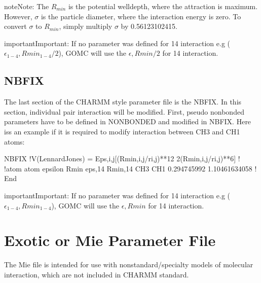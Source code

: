 \documentclass[letterpaper,10pt,english]{sphinxmanual}
\begin{document}
\begin{sphinxadmonition}{note}{Note:}
The \(R_{min}\) is the potential well\sphinxhyphen{}depth, where the attraction is maximum. However, \(\sigma\) is the particle diameter, where the interaction energy is zero. To convert \(\sigma\) to \(R_{min}\), simply multiply \(\sigma\) by 0.56123102415.
\end{sphinxadmonition}

\begin{sphinxadmonition}{important}{Important:}
If no parameter was defined for 1\sphinxhyphen{}4 interaction e.g (\(\epsilon_{1-4}, Rmin_{1-4}/2\)), GOMC will use the  \(\epsilon, Rmin/2\) for 1\sphinxhyphen{}4 interaction.
\end{sphinxadmonition}


\subsection{NBFIX}
\label{\detokenize{input_file:nbfix}}
The last section of the CHARMM style parameter file is the NBFIX. In this section, individual pair interaction will be modified. First, pseudo non\sphinxhyphen{}bonded parameters have to be defined in NONBONDED and modified in NBFIX. Here iss an example if it is required to modify interaction between CH3 and CH1 atoms:

\begin{sphinxVerbatim}[commandchars=\\\{\}]
NBFIX
!V(Lennard\PYGZhy{}Jones) = Eps,i,j[(Rmin,i,j/ri,j)**12 \PYGZhy{} 2(Rmin,i,j/ri,j)**6]
!
!atom atom  epsilon         Rmin          eps,1\PYGZhy{}4   Rmin,1\PYGZhy{}4
CH3   CH1   \PYGZhy{}0.294745992    1.10461634058 !
End
\end{sphinxVerbatim}

\begin{sphinxadmonition}{important}{Important:}
If no parameter was defined for 1\sphinxhyphen{}4 interaction e.g (\(\epsilon_{1-4}, Rmin_{1-4}\)), GOMC will use the  \(\epsilon, Rmin\) for 1\sphinxhyphen{}4 interaction.
\end{sphinxadmonition}


\section{Exotic or Mie Parameter File}
\label{\detokenize{input_file:exotic-or-mie-parameter-file}}
The Mie file is intended for use with nonstandard/specialty models of molecular interaction, which are not included in CHARMM standard.
\end{document}
